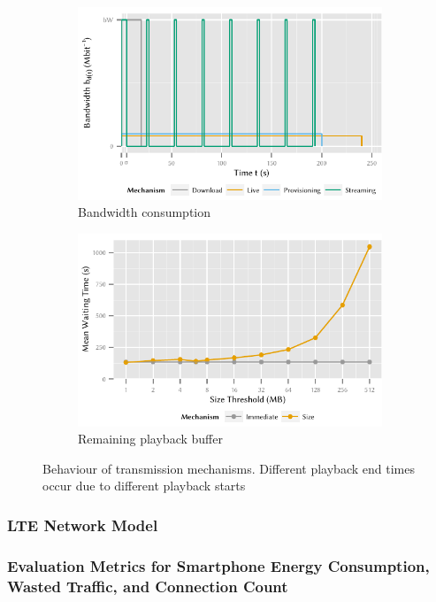 \begin{figure}
	\begin{subfigure}[b]{\textwidth}
	\centering
	\includegraphics{application/lte_video/system_model/figures/video_model_bandwidth}
	\caption{Bandwidth consumption}\label{fig:application:lte_video:system_model:video_model:bandwidth}
	\end{subfigure} 
	\begin{subfigure}[b]{\textwidth}
	\centering
	\includegraphics{application/cloud_file_synchronization/numerical_evaluation/figures/size_delay}
	\caption{Remaining playback buffer}\label{fig:application:lte_video:system_model:video_model:playback}
	\end{subfigure}

	\caption{Behaviour of transmission mechanisms. Different playback end times occur due to different playback starts}\label{fig:application:cloud_file_synchronisation:numerical_evaluation:waiting_time:waiting_time}
\end{figure}

\subsubsection*{LTE Network Model}\label{sec:application:lte_video:system_model:lte_network_model}

\subsubsection*{Evaluation Metrics for Smartphone Energy Consumption, Wasted Traffic, and Connection Count}\label{sec:application:lte_video:system_model:model_assumptions:metrics}
